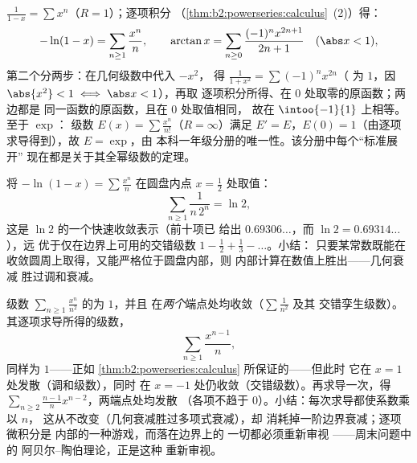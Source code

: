 \begin{example}\label{ex:b2:powerseries:classics}
$\displaystyle\frac{1}{1 - x} = \sum x^n$（$R = 1$）；逐项积分
（\cref{thm:b2:powerseries:calculus}~(2)）得：
\[
-\ln(1 - x) = \sum_{n\geq1} \frac{x^n}{n},
\qquad
\arctan x = \sum_{n \geq 0} \frac{(-1)^n x^{2n+1}}{2n+1}
\quad (\abs x < 1),
\]
第二个分两步：在几何级数中代入 $-x^2$，
得 $\frac{1}{1+x^2} = \sum(-1)^nx^{2n}$（
为 $1$，因 $\abs{x^2} < 1 \iff \abs x < 1$），再取
逐项积分所得、在 $0$ 处取零的原函数；两边都是
同一函数的原函数，且在 $0$ 处取值相同，
故在 $\intoo{-1}{1}$ 上相等。至于 $\exp$：
级数 $E(x) = \sum \frac{x^n}{n!}$（$R = \infty$）满足
$E' = E$，$E(0) = 1$（由逐项求导得到），故 $E = \exp$，由
本科一年级分册的唯一性。该分册中每个“标准展开”
现在都是关于其全幂级数的定理。
\end{example}

\begin{example}[在圆盘内部计算一个对数]\label{ex:b2:powerseries:lntwo}
将 $-\ln(1-x) = \sum\frac{x^n}{n}$ 在圆盘内点
$x = \frac12$ 处取值：
\[
\sum_{n\geq1}\frac{1}{n\,2^n} = \ln 2 ,
\]
这是 $\ln 2$ 的一个快速收敛表示（前十项已
给出 $0.69306\ldots$，而 $\ln 2 = 0.69314\ldots$），远
优于仅在边界上可用的交错级数 $1 - \frac12 + \frac13 -
\dots$。小结：
只要某常数既能在收敛圆周上取得，又能严格位于圆盘内部，则
内部计算在数值上胜出——几何衰减
胜过调和衰减。
\end{example}

\begin{example}\label{ex:b2:powerseries:boundaryloss}
级数 $\sum_{n\geq1}\frac{x^n}{n^2}$ 的为 $1$，并且
在\emph{两个}端点处均收敛（$\sum\frac1{n^2}$ 及其
交错孪生级数）。其逐项求导所得的级数，
\[
\sum_{n\geq1}\frac{x^{n-1}}{n} ,
\]
同样为 $1$——正如
\cref{thm:b2:powerseries:calculus} 所保证的——但此时
它在 $x = 1$ 处发散（调和级数），同时
在 $x = -1$ 处仍收敛（交错级数）。再求导一次，得
$\sum_{n\geq2}\frac{n-1}{n}x^{n-2}$，两端点处均发散
（各项不趋于 $0$）。小结：每次求导都使系数乘以 $n$，
这从不改变（几何衰减胜过多项式衰减），却
消耗掉一阶边界衰减；逐项微积分是
内部的一种游戏，而落在边界上的
一切都必须重新审视 ——周末问题中的
阿贝尔–陶伯理论，正是这种
重新审视。
\end{example}

